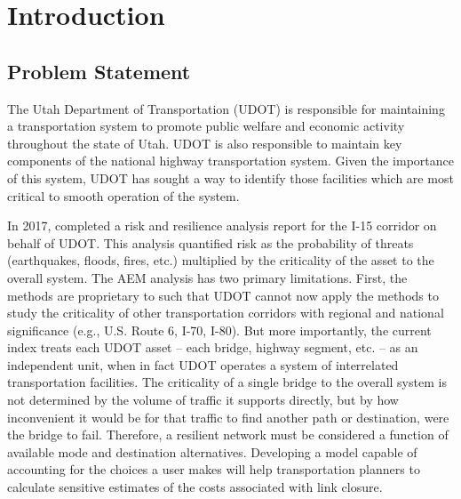 \chapter{Introduction}
\label{chp:chapter1}
\graphicspath{{figures/}{figures/chapter1/}}

\section{Problem Statement}
The Utah Department of Transportation (UDOT) is responsible for maintaining a
transportation system to promote public welfare and economic activity throughout
the state of Utah. UDOT is also responsible to maintain key components of the
national highway transportation system. Given the importance of this system,
UDOT has sought a way to identify those facilities which are most critical to smooth
operation of the system.

In 2017, \citet{aem2017} completed a risk and resilience analysis report for the I-15 corridor on behalf of
UDOT. This analysis quantified risk as the probability of threats (earthquakes, floods, fires,
etc.) multiplied by the criticality of the asset to the overall system. The AEM
analysis has two primary limitations. First, the methods are proprietary to
\citet{aem2017} such that UDOT cannot now apply the methods to study the criticality of other transportation
corridors with regional and national significance (e.g., U.S. Route 6, I-70, I-80). But more
importantly, the current index treats each UDOT asset – each bridge, highway segment, etc. – as an
independent unit, when in fact UDOT operates a system of interrelated transportation facilities. The criticality
of a single bridge to the overall system is not determined by the volume of traffic it supports
directly, but by how inconvenient it would be for that traffic to find another path or destination,
were the bridge to fail. Therefore, a resilient network must be considered a function of
available mode and destination alternatives. Developing a model capable of accounting for the choices a user makes will help
transportation planners to calculate sensitive estimates of the costs associated with link closure.

